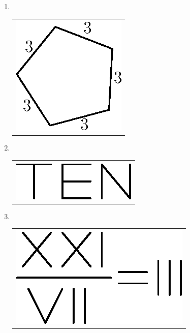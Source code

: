 \begin{enumerate}
\bigskip

\eject

\item 
~

  \vskip -0.5cm
  
\begin{tabular}[t]{c}
\centering
\includegraphics{src/figures/ans37.eps}
\end{tabular}

\bigskip
\bigskip

\item 
~

  \vskip -0.4cm
  
\begin{tabular}[t]{c}
\centering
\includegraphics{src/figures/ans38.eps}
\end{tabular}

\item 
~

  \vskip -0.4cm
  
\begin{tabular}[t]{c}
\centering
\includegraphics{src/figures/ans39.eps}
\end{tabular}

\bigskip


\end{enumerate}
